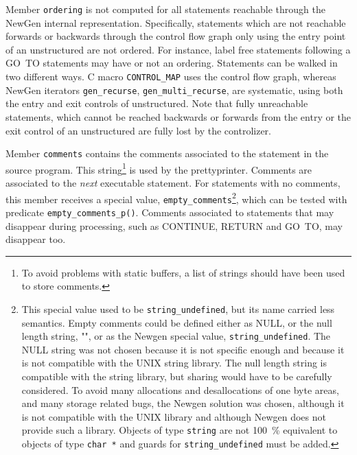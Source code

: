 \documentclass[a4paper]{article}
\begin{document}
Member \texttt{ordering} is not computed for all statements reachable
through the NewGen internal representation. Specifically, statements
which are not reachable forwards or backwards through the control flow
graph only using the entry point of an unstructured are not ordered. For
instance, label free statements following a GO~TO statements may have or
not an ordering. Statements can be walked in two different ways. C macro
\verb/CONTROL_MAP/ uses the control flow graph,
whereas NewGen iterators \verb/gen_recurse/,
\verb/gen_multi_recurse/, are systematic,
using both the entry and exit controls of unstructured. Note that fully
unreachable statements, which cannot be reached backwards or forwards
from the entry or the exit control of an unstructured are fully lost by
the controlizer.

\begin{comment}
Notons que le champs \verb/ordering/ n'est pas forc�ment calcul� pour
tous les statements. En particulier, les statements qui ne sont pas
accessibles d'apr�s le flot de contr�le n'en ont pas. Les statements
sans �tiquette se trouvant derri�re un GOTO en sont un exemple. Les
statements peuvent �tre parcourus de mani�re s�lective, suivant le
flot de contr�le, avec la macro \verb/CONTROL_MAP/\index{CONTROL MAP},
ou de mani�re syst�matique avec les fonctions de parcours de NewGen,
\verb/gen_recurse/\index{gen\_recurse},
\verb/gen_multi_recurse/\index{gen\_multi\_recurse}\ldots
\end{comment}

Member \texttt{comments} contains the comments associated to the
statement in the source program. This string\footnote{To avoid
  problems with static buffers, a list of strings should have been
  used to store comments.} is used by the prettyprinter. Comments are
associated to the \emph{next} executable statement. For statements with
no comments, this member receives a special value,
\verb/empty_comments/\footnote{This special value used to be
  \texttt{string\_undefined}, but its name carried less semantics.
  Empty comments could be defined either as NULL, or the null length
  string, "", or as the Newgen special value,
  \texttt{string\_undefined}. The NULL string was not chosen because
  it is not specific enough and because it is not compatible with the
  UNIX string library. The null length string is compatible with the
  string library, but sharing would have to be carefully considered.
  To avoid many allocations and desallocations of one byte areas, and
  many storage related bugs, the Newgen solution was chosen, although
  it is not compatible with the UNIX library and although Newgen does
  not provide such a library. Objects of type \texttt{string} are not
  100~\% equivalent to objects of type \texttt{char *} and guards for
  \texttt{string\_undefined} must be added.}, which can be tested with
predicate \verb/empty_comments_p()/. Comments associated to statements
that may disappear during processing, such as CONTINUE, RETURN and
GO~TO, may disappear too.
\end{document}
